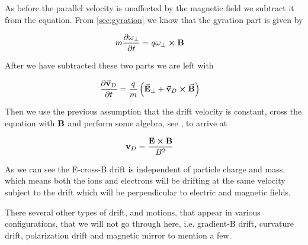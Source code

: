 	
	As before the parallel velocity is unaffected by the magnetic field we subtract
	it from the equation. From \cref{sec:gyration} we know that the gyration
	part is given by

	\begin{align}
		m\pdv{\vb{\omega}_\perp}{t} &= q\vb{\vb{\omega}_\perp}\cross\vb{B}
	\end{align}

	After we have subtracted these two parts we are left with

	\begin{align}
		\pdv{\va{v}_D}{t} &= \frac{q}{m} \left( \va{E}_\perp + \va{v}_D \cross \va{B} \right)
	\end{align}

	Then we use the previous assumption that the drift velocity is constant,
	cross the equation with \(\vb{B}\) and perform some algebra, see \citet{goldston_introduction_1995},
	to arrive at

	\begin{align}
		\vb{v}_D &= \frac{\vb{E}\cross\vb{B}}{B^2}
	\end{align}

	As we can see the E-cross-B drift is independent of particle charge and mass,
	which means both the ions and electrons will be drifting at the same velocity
	subject to the drift which will be perpendicular to electric and magnetic fields.

	There several other types of drift, and motions, that appear in various configurations,
	that we will not go through here, i.e. gradient-B drift, curvature drift, polarization drift and magnetic mirror
	to mention a few.
